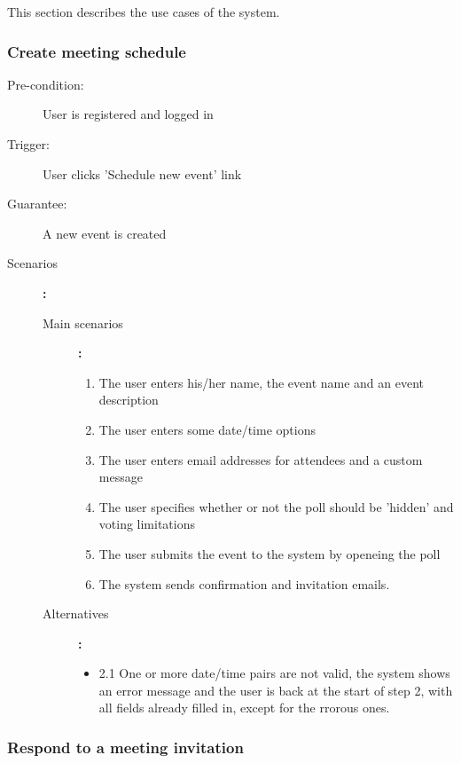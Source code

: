 \label{sec:usecases}
This section describes the use cases of the system.

\subsubsection{Create meeting schedule}

\begin{description}
	\item[Pre-condition:] User is registered and logged in
	\item[Trigger:] User clicks 'Schedule new event' link
	\item[Guarantee:] A new event is created
	\item[Scenarios]\textbf{:}\\
				\begin{description}
					\item[Main scenarios]\textbf{:}\\
								\begin{enumerate}
									\item The user enters his/her name, the event name and an event description
									\item The user enters some date/time options
									\item The user enters email addresses for attendees and a custom message
									\item The user specifies whether or not the poll should be 'hidden' and voting limitations
									\item The user submits the event to the system by openeing the poll
									\item The system sends confirmation and invitation emails.
								\end{enumerate}
					\item[Alternatives]\textbf{:}\\
								\begin{itemize}
									\item 2.1 One or more date/time pairs are not valid, the system shows an error message and the user is back at the start of step 2, with all fields already filled in, except for the rrorous ones.
								\end{itemize}
				\end{description}
\end{description}


\subsubsection{Respond to a meeting invitation}

